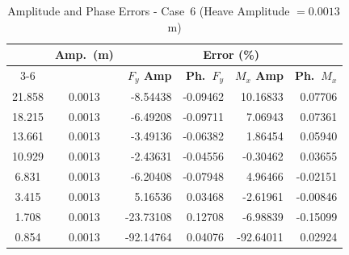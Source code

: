 \documentclass[../main]{subfiles}
\begin{document}
\begin{table}[htbp]
\centering
\caption{Amplitude and Phase Errors - Case~6 (Heave Amplitude $= 0.0013$\,m)}
\label{tab:err_case6}
\renewcommand{\arraystretch}{1.25}
\begin{tabular}{|c|c|r|r|r|r|}
\hline
\rule{0pt}{12pt}
\multirow{2}{*}{\textbf{$U_r$}} &
\multirow{2}{*}{\textbf{Amp.\ (m)}} &
\multicolumn{4}{c|}{\textbf{Error (\%)}} \\[2pt]
\cline{3-6}
\rule{0pt}{10pt} & &
\textbf{$F_y$ Amp} &
\textbf{Ph.\ $F_y$} &
\textbf{$M_x$ Amp} &
\textbf{Ph.\ $M_x$} \\[4pt]
\hline
21.858 & 0.0013 &  -8.54438 & -0.09462 & 10.16833 &  0.07706 \\
18.215 & 0.0013 &  -6.49208 & -0.09711 &  7.06943 &  0.07361 \\
13.661 & 0.0013 &  -3.49136 & -0.06382 &  1.86454 &  0.05940 \\
10.929 & 0.0013 &  -2.43631 & -0.04556 & -0.30462 &  0.03655 \\
 6.831 & 0.0013 &  -6.20408 & -0.07948 &  4.96466 & -0.02151 \\
 3.415 & 0.0013 &   5.16536 &  0.03468 & -2.61961 & -0.00846 \\
 1.708 & 0.0013 & -23.73108 &  0.12708 & -6.98839 & -0.15099 \\
 0.854 & 0.0013 & -92.14764 &  0.04076 &-92.64011 &  0.02924 \\
\hline
\end{tabular}
\end{table}

\FloatBarrier


\end{document}
